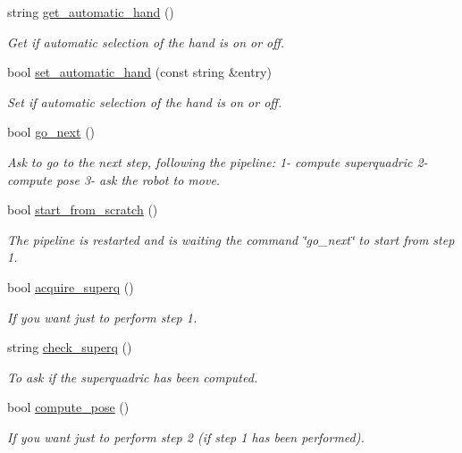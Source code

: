 \begin{DoxyCompactItemize}
string \hyperlink{classGraspDemo_aaf774f3184d8c140deb7865fa3dbe4e6}{get\+\_\+automatic\+\_\+hand} ()
\begin{DoxyCompactList}\small\item\em Get if automatic selection of the hand is on or off. \end{DoxyCompactList}\item 
bool \hyperlink{classGraspDemo_ae609e2ec7eea3adb5fba5b11c8e71c33}{set\+\_\+automatic\+\_\+hand} (const string \&entry)
\begin{DoxyCompactList}\small\item\em Set if automatic selection of the hand is on or off. \end{DoxyCompactList}\item 
bool \hyperlink{classGraspDemo_a478868cf5bd110f700327af69fa50a24}{go\+\_\+next} ()
\begin{DoxyCompactList}\small\item\em Ask to go to the next step, following the pipeline\+: 1-\/ compute superquadric 2-\/ compute pose 3-\/ ask the robot to move. \end{DoxyCompactList}\item 
bool \hyperlink{classGraspDemo_a48b305f002b084ae751098e52b930b02}{start\+\_\+from\+\_\+scratch} ()
\begin{DoxyCompactList}\small\item\em The pipeline is restarted and is waiting the command \char`\"{}go\+\_\+next\char`\"{} to start from step 1. \end{DoxyCompactList}\item 
bool \hyperlink{classGraspDemo_aaccf8483cef8af69b7053d453ce0808e}{acquire\+\_\+superq} ()
\begin{DoxyCompactList}\small\item\em If you want just to perform step 1. \end{DoxyCompactList}\item 
string \hyperlink{classGraspDemo_adf4d974fbc66aa2706709985080d5625}{check\+\_\+superq} ()
\begin{DoxyCompactList}\small\item\em To ask if the superquadric has been computed. \end{DoxyCompactList}\item 
bool \hyperlink{classGraspDemo_a6bd2f7ffee3191be392b1deb7d6c0a39}{compute\+\_\+pose} ()
\begin{DoxyCompactList}\small\item\em If you want just to perform step 2 (if step 1 has been performed). \end{DoxyCompactList}\item 

\end{DoxyCompactItemize}
